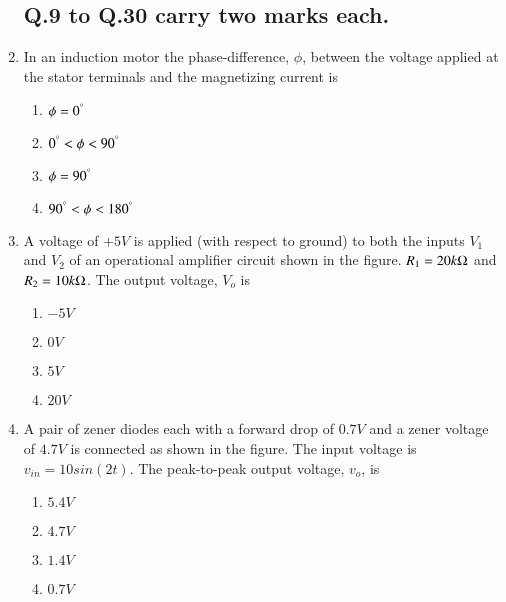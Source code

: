 \documentclass[journal]{IEEEtran}
\begin{document}
\begin{enumerate}

\subsection*{Q.9 to Q.30 carry two marks each.}

    \item In an induction motor the phase-difference, $\phi$, between the voltage applied at the stator terminals and the magnetizing current is
        \begin{enumerate}
            \item $\phi=0^\degree$
            \item $0^\degree<\phi<90^\degree$
            \item $\phi=90^\degree$
            \item $90^\degree<\phi<180^\degree$
        \end{enumerate}
    
    \item A voltage of $+5V$ is applied (with respect to ground) to both the inputs $V_1$ and $V_2$ of an operational amplifier circuit shown in the figure. $R_1=20k\ohm$ and $R_2=10k\ohm$. The output voltage, $V_o$ is
        \begin{figure}[!ht]
            \centering
            
        \end{figure}
        \begin{enumerate}
            \item $-5V$
            \item $0V$
            \item $5V$
            \item $20V$
        \end{enumerate}
    
    \item A pair of zener diodes each with a forward drop of $0.7V$ and a zener voltage of $4.7V$ is connected as shown in the figure. The input voltage is $v_{in}=10sin(2t)$. The peak-to-peak output voltage, $v_o$, is
        \begin{figure}[!ht]
            \centering
            
        \end{figure}
        \begin{enumerate}
            \item $5.4V$
            \item $4.7V$
            \item $1.4V$
            \item $0.7V$
        \end{enumerate}


\end{enumerate}
\end{document}
